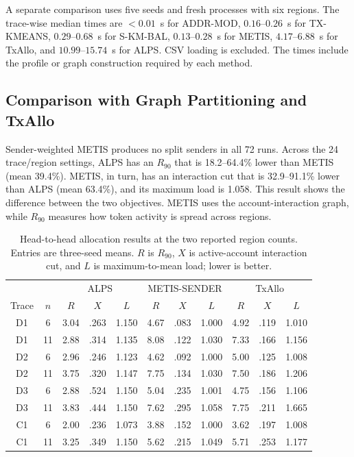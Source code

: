 \documentclass[conference,letterpaper]{IEEEtran}
\begin{document}
A separate comparison uses five seeds and fresh processes with six regions.
The trace-wise median times are $<0.01$~s for ADDR-MOD,
$0.16$--$0.26$~s for TX-KMEANS, $0.29$--$0.68$~s for S-KM-BAL,
$0.13$--$0.28$~s for METIS, $4.17$--$6.88$~s for TxAllo, and
$10.99$--$15.74$~s for ALPS. CSV loading is excluded. The times include the
profile or graph construction required by each method.

\subsection{Comparison with Graph Partitioning and TxAllo}
\label{sec:txallo}

Sender-weighted METIS produces no split senders in all 72 runs. Across the
24 trace/region settings, ALPS has an $R_{90}$ that is
18.2--64.4\% lower than METIS (mean 39.4\%). METIS, in turn, has an
interaction cut that is 32.9--91.1\% lower than ALPS (mean 63.4\%), and its
maximum load is 1.058. This result shows the difference between the two
objectives. METIS uses the account-interaction graph, while $R_{90}$ measures
how token activity is spread across regions.

\begin{table}[t]
\caption{Head-to-head allocation results at the two reported region counts.
Entries are three-seed means. $R$ is $R_{90}$, $X$ is active-account
interaction cut, and $L$ is maximum-to-mean load; lower is better.}
\label{tab:headtohead}
\centering
\scriptsize
\setlength{\tabcolsep}{3.2pt}
\begin{tabular}{@{}ccccc@{\quad}ccc@{\quad}ccc@{}}
\toprule
& & \multicolumn{3}{c}{ALPS} & \multicolumn{3}{c}{METIS-SENDER} &
\multicolumn{3}{c}{TxAllo}\\
Trace & $n$ & $R$ & $X$ & $L$ & $R$ & $X$ & $L$ & $R$ & $X$ & $L$\\
\midrule
D1 & 6  & 3.04 & .263 & 1.150 & 4.67 & .083 & 1.000 & 4.92 & .119 & 1.010\\
D1 & 11 & 2.88 & .314 & 1.135 & 8.08 & .122 & 1.030 & 7.33 & .166 & 1.156\\
D2 & 6  & 2.96 & .246 & 1.123 & 4.62 & .092 & 1.000 & 5.00 & .125 & 1.008\\
D2 & 11 & 3.75 & .320 & 1.147 & 7.75 & .134 & 1.030 & 7.50 & .186 & 1.206\\
D3 & 6  & 2.88 & .524 & 1.150 & 5.04 & .235 & 1.001 & 4.75 & .156 & 1.106\\
D3 & 11 & 3.83 & .444 & 1.150 & 7.62 & .295 & 1.058 & 7.75 & .211 & 1.665\\
C1 & 6  & 2.00 & .236 & 1.073 & 3.88 & .152 & 1.000 & 3.62 & .197 & 1.008\\
C1 & 11 & 3.25 & .349 & 1.150 & 5.62 & .215 & 1.049 & 5.71 & .253 & 1.177\\
\bottomrule
\end{tabular}
\end{table}
\end{document}
